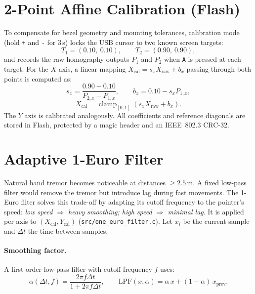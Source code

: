 \documentclass[11pt,a4paper]{article}
\newcommand{\code}[1]{\texttt{#1}}
\DeclareMathOperator{\clamp}{clamp}
\begin{document}
\section{2-Point Affine Calibration (Flash)}
\label{sec:calib}

To compensate for bezel geometry and mounting tolerances, calibration mode
(hold \code{+} and \code{-} for 3\,s) locks the USB cursor to two known screen
targets:
\begin{equation}
  T_1 = (0.10,\ 0.10), \qquad T_2 = (0.90,\ 0.90),
\end{equation}
and records the raw homography outputs $P_1$ and $P_2$ when \code{A} is
pressed at each target. For the $X$ axis, a linear mapping
$X_{\text{cal}} = s_x X_{\text{raw}} + b_x$ passing through both points is
computed as:
\begin{equation}
  s_x = \frac{0.90 - 0.10}{P_{2,x} - P_{1,x}}, \qquad
  b_x = 0.10 - s_x P_{1,x},
\end{equation}
\begin{equation}
  X_{\text{cal}} = \clamp_{[0,1]}\!\left(s_x X_{\text{raw}} + b_x\right).
\end{equation}
The $Y$ axis is calibrated analogously. All coefficients and reference
diagonals are stored in Flash, protected by a magic header and an IEEE~802.3
CRC-32.

\section{Adaptive 1-Euro Filter}
\label{sec:filter}

Natural hand tremor becomes noticeable at distances $\ge 2.5$\,m. A fixed
low-pass filter would remove the tremor but introduce lag during fast
movements. The 1-Euro filter solves this trade-off by adapting its cutoff
frequency to the pointer's speed: \emph{low speed $\Rightarrow$ heavy
smoothing; high speed $\Rightarrow$ minimal lag}.
It is applied per axis to $(X_{\text{cal}}, Y_{\text{cal}})$
(\code{src/one\_euro\_filter.c}). Let $x_i$ be the current sample and $\Delta t$
the time between samples.

\paragraph{Smoothing factor.} A first-order low-pass filter with cutoff
frequency $f$ uses:
\begin{equation}
  \alpha(\Delta t, f) = \frac{2\pi f \Delta t}{1 + 2\pi f \Delta t},
  \qquad
  \mathrm{LPF}(x, \alpha) = \alpha\, x + (1-\alpha)\, x_{\text{prev}} .
\end{equation}
\end{document}
